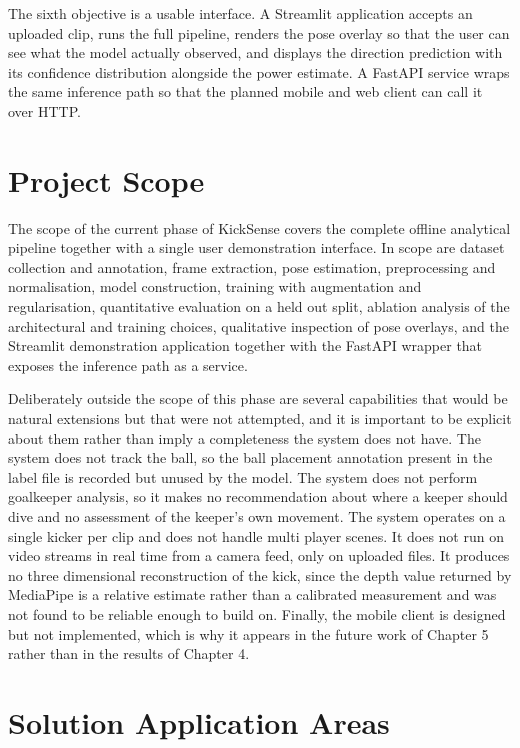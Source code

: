 The sixth objective is a usable interface. A Streamlit application accepts an uploaded clip, runs the full pipeline, renders the pose overlay so that the user can see what the model actually observed, and displays the direction prediction with its confidence distribution alongside the power estimate. A FastAPI service wraps the same inference path so that the planned mobile and web client can call it over HTTP.

\section{Project Scope}

The scope of the current phase of KickSense covers the complete offline analytical pipeline together with a single user demonstration interface. In scope are dataset collection and annotation, frame extraction, pose estimation, preprocessing and normalisation, model construction, training with augmentation and regularisation, quantitative evaluation on a held out split, ablation analysis of the architectural and training choices, qualitative inspection of pose overlays, and the Streamlit demonstration application together with the FastAPI wrapper that exposes the inference path as a service.

Deliberately outside the scope of this phase are several capabilities that would be natural extensions but that were not attempted, and it is important to be explicit about them rather than imply a completeness the system does not have. The system does not track the ball, so the ball placement annotation present in the label file is recorded but unused by the model. The system does not perform goalkeeper analysis, so it makes no recommendation about where a keeper should dive and no assessment of the keeper's own movement. The system operates on a single kicker per clip and does not handle multi player scenes. It does not run on video streams in real time from a camera feed, only on uploaded files. It produces no three dimensional reconstruction of the kick, since the depth value returned by MediaPipe is a relative estimate rather than a calibrated measurement and was not found to be reliable enough to build on. Finally, the mobile client is designed but not implemented, which is why it appears in the future work of Chapter 5 rather than in the results of Chapter 4.

\section{Solution Application Areas}

